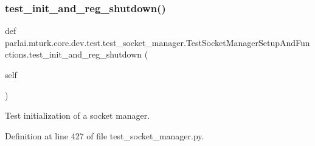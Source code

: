 \subsubsection{\texorpdfstring{test\+\_\+init\+\_\+and\+\_\+reg\+\_\+shutdown()}{test\_init\_and\_reg\_shutdown()}}
{\footnotesize\ttfamily def parlai.\+mturk.\+core.\+dev.\+test.\+test\+\_\+socket\+\_\+manager.\+Test\+Socket\+Manager\+Setup\+And\+Functions.\+test\+\_\+init\+\_\+and\+\_\+reg\+\_\+shutdown (\begin{DoxyParamCaption}\item[{}]{self }\end{DoxyParamCaption})}

\begin{DoxyVerb}Test initialization of a socket manager.
\end{DoxyVerb}
 

Definition at line 427 of file test\+\_\+socket\+\_\+manager.\+py.


